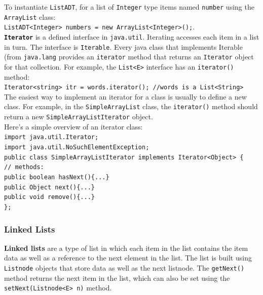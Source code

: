 To instantiate \texttt{ListADT}, for a list of \texttt{Integer} type items named \texttt{number} using the \texttt{ArrayList} class: \\

\texttt{ListADT<Integer> numbers = new ArrayList<Integer>();}. \\

\texttt{\textbf{Iterator}} is a defined interface in \texttt{java.util}. Iterating accesses each item in a list in turn. The interface is \texttt{Iterable}. Every java class that implements Iterable (from \texttt{java.lang} provides an \texttt{iterator} method that returns an \texttt{Iterator} object for that collection. For example, the \texttt{List<E>} interface has an \texttt{iterator()} method: \\

\texttt{Iterator<string> itr = words.iterator(); //words is a List<String>} \\

The easiest way to implement an iterator for a class is usually to define a new class. For example, in the \texttt{SimpleArrayList} class, the \texttt{iterator()} method should return a new \texttt{SimpleArrayListIterator} object. \\

Here's a simple overview of an iterator class: \\

\texttt{import java.util.Iterator;} \\
\indent \texttt{import java.util.NoSuchElementException;} \\
\indent \texttt{public class SimpleArrayListIterator implements Iterator<Object> \{} \\
\indent \indent \texttt{// methods:} \\
\indent \indent \texttt{public boolean hasNext()\{...\}} \\
\indent \indent \texttt{public Object next()\{...\}} \\
\indent \indent \texttt{public void remove()\{...\}} \\
\indent \texttt{\};} \\

\subsubsection{Linked Lists}

\textbf{Linked lists} are a type of list in which each item in the list contains the item data as well as a reference to the next element in the list. The list is built using \texttt{Listnode} objects that store data as well as the next listnode. The \texttt{getNext()} method returns the next item in the list, which can also be set using the \texttt{setNext(Listnode<E> n)} method. 

